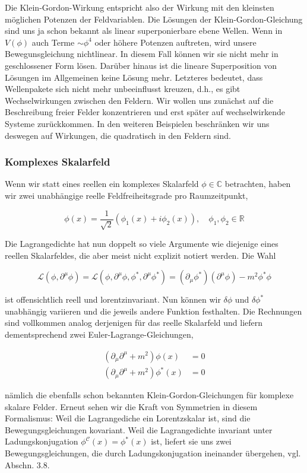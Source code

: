 \documentclass[10pt, letterpaper]{article}
\begin{document}
Die Klein-Gordon-Wirkung entspricht also der Wirkung mit den kleinsten möglichen Potenzen der Feldvariablen. Die Lösungen der Klein-Gordon-Gleichung sind uns ja schon bekannt als linear superponierbare ebene Wellen. Wenn in $V(\phi)$ auch Terme $\sim \phi^{4}$ oder höhere Potenzen auftreten, wird unsere Bewegunsgleichung nichtlinear. In diesem Fall können wir sie nicht mehr in geschlossener Form lösen. Darüber hinaus ist die lineare Superposition von Lösungen im Allgemeinen keine Lösung mehr. Letzteres bedeutet, dass Wellenpakete sich nicht mehr unbeeinflusst kreuzen, d.h., es gibt Wechselwirkungen zwischen den Feldern. Wir wollen uns zunächst auf die Beschreibung freier Felder konzentrieren und erst später auf wechselwirkende Systeme zurückkommen. In den weiteren Beispielen beschränken wir uns deswegen auf Wirkungen, die quadratisch in den Feldern sind.

\subsubsection*{Komplexes Skalarfeld}
Wenn wir statt eines reellen ein komplexes Skalarfeld $\phi \in \mathbb{C}$ betrachten, haben wir zwei unabhängige reelle Feldfreiheitsgrade pro Raumzeitpunkt,

$$
\phi(x)=\frac{1}{\sqrt{2}}\left(\phi_{1}(x)+i \phi_{2}(x)\right), \quad \phi_{1}, \phi_{2} \in \mathbb{R}
$$

Die Lagrangedichte hat nun doppelt so viele Argumente wie diejenige eines reellen Skalarfeldes, die aber meist nicht explizit notiert werden. Die Wahl

$$
\mathscr{L}\left(\phi, \partial^{\mu} \phi\right)=\mathscr{L}\left(\phi, \partial^{\mu} \phi, \phi^{*}, \partial^{\mu} \phi^{*}\right)=\left(\partial_{\mu} \phi^{*}\right)\left(\partial^{\mu} \phi\right)-m^{2} \phi^{*} \phi
$$

ist offensichtlich reell und lorentzinvariant. Nun können wir $\delta \phi$ und $\delta \phi^{*}$ unabhängig variieren und die jeweils andere Funktion festhalten. Die Rechnungen sind vollkommen analog derjenigen für das reelle Skalarfeld und liefern dementsprechend zwei Euler-Lagrange-Gleichungen,

$$
\begin{aligned}
\left(\partial_{\mu} \partial^{\mu}+m^{2}\right) \phi(x) & =0 \\
\left(\partial_{\mu} \partial^{\mu}+m^{2}\right) \phi^{*}(x) & =0
\end{aligned}
$$

nämlich die ebenfalls schon bekannten Klein-Gordon-Gleichungen für komplexe skalare Felder. Erneut sehen wir die Kraft von Symmetrien in diesem Formalismus: Weil die Lagrangediche ein Lorentzskalar ist, sind die Bewegungsgleichungen kovariant. Weil die Lagrangedichte invariant unter Ladungskonjugation $\phi^{\mathcal{C}}(x)=\phi^{*}(x)$ ist, liefert sie uns zwei Bewegungsgleichungen, die durch Ladungskonjugation ineinander übergehen, vgl. Abschn. 3.8.
\end{document}
